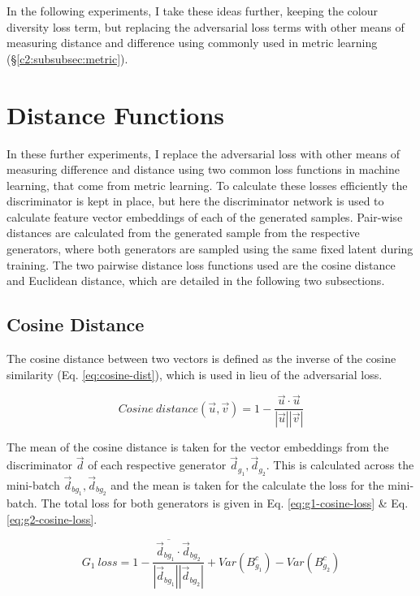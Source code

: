 In the following experiments, I take these ideas further, keeping the colour diversity loss term, but replacing the adversarial loss terms with other means of measuring distance and difference using commonly used in metric learning (\S \ref{c2:subsubsec:metric}). 
  
\section{Distance Functions}

In these further experiments, I replace the adversarial loss with other means of measuring difference and distance using two common loss functions in machine learning, that come from metric learning. 
To calculate these losses efficiently the discriminator is kept in place, but here the discriminator network is used to calculate feature vector embeddings of each of the generated samples.
Pair-wise distances are calculated from the generated sample from the respective generators, where both generators are sampled using the same fixed latent during training.
The two pairwise distance loss functions used are the cosine distance and Euclidean distance, which are detailed in the following two subsections.

\subsection{Cosine Distance}

The cosine distance between two vectors is defined as the inverse of the cosine similarity (Eq. \ref{eq:cosine-dist}), which is used in lieu of the adversarial loss. 

\begin{equation} 
    Cosine\ distance(\vec u, \vec v) = 1 - \frac{\vec u \cdot \vec u}{|\vec u||\vec v|}
    \label{eq:cosine-dist}
\end{equation}

The mean of the cosine distance is taken for the vector embeddings from the discriminator $\vec d$ of each respective generator $\vec d_{g_{1}}, \vec d_{g_{2}}$. 
This is calculated across the mini-batch $\vec d_{bg_{1}}, \vec d_{bg_{2}}$  and the mean is taken for the calculate the loss for the mini-batch. 
The total loss for both generators is given in Eq. \ref{eq:g1-cosine-loss} \& Eq. \ref{eq:g2-cosine-loss}.

\begin{equation} 
    G_{1}\ loss = \overline{1 - \frac{\vec d_{bg_{1}} \cdot \vec d_{bg_{2}}}{|\vec d_{bg_{1}}||\vec d_{bg_{2}}|}} + Var(B_{g_{1}}^{c}) - Var(B_{g_{2}}^{c})
    \label{eq:g1-cosine-loss}
\end{equation}

